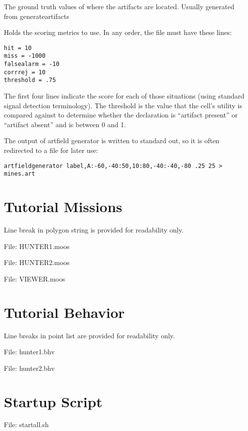 \begin{hangpar}{\pin}{}
The ground truth values of where the artifacts are located.  Usually generated from generateartifacts
\end{hangpar}

\begin{hangpar}{\pin}{}
Holds the scoring metrics to use.  In any order, the file must have these lines:
\scriptsize
\begin{verbatim}
hit = 10
miss = -1000
falsealarm = -10
corrrej = 10
threshold = .75
\end{verbatim}
\normalsize

The first four lines indicate the score for each of those situations (using standard signal detection terminology).  The threshold is the value that the cell's utility is compared against to determine whether the declaration is ``artifact present'' or ``artifact absent'' and is between 0 and 1.
\end{hangpar}

The output of artfield generator is written to standard out, so it is often redirected to a file for later use:

\scriptsize
{\tt artfieldgenerator label,A:-60,-40:50,10:80,-40:-40,-80 .25 25 > mines.art}
\normalsize

\section{Tutorial Missions}
\label{app:tutorialmission}
Line break in polygon string is provided for readability only.

File: HUNTER1.moos
\scriptsize

\normalsize

File: HUNTER2.moos
\scriptsize

\normalsize

File: VIEWER.moos
\scriptsize

\normalsize

\section{Tutorial Behavior}
\label{app:tutorialbehavior}
Line breaks in point list are provided for readability only.

File: hunter1.bhv
\scriptsize

\normalsize

File: hunter2.bhv
\scriptsize

\normalsize

\section{Startup Script}
\label{app:startall}
File: startall.sh
\scriptsize

\normalsize
